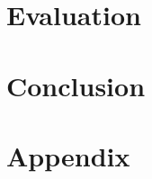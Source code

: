 \documentclass{article}
\begin{document}
\section{Evaluation}
\label{sec:eval}


\section{Conclusion}
\label{sec:con}


%



\section{Appendix}

\end{document}

